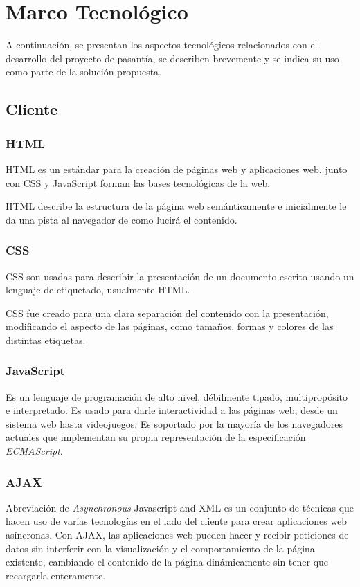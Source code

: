 \chapter{Marco Tecnológico}
\thispagestyle{empty} %

A continuación, se presentan los aspectos tecnológicos relacionados con el desarrollo del proyecto de pasantía, se describen brevemente y se indica su uso como parte de la solución propuesta.

\section{Cliente}

\subsection{HTML}

\gls{HTML} es un estándar para la creación de páginas web y aplicaciones web. junto con \gls{CSS} y JavaScript forman las bases tecnológicas de la web. \cite{bib:html}

HTML describe la estructura de la página web semánticamente e inicialmente le da una pista al navegador de como lucirá el contenido.


\subsection{CSS}
\gls{CSS} son usadas para describir la presentación de un documento escrito usando un lenguaje de etiquetado, usualmente \gls{HTML}. 

\gls{CSS} fue creado para una clara separación del contenido con la presentación, modificando el aspecto de las páginas, como tamaños, formas y colores de las distintas etiquetas. \cite{bib:css}

\subsection{JavaScript}
Es un lenguaje de programación de alto nivel, débilmente tipado, multipropósito e interpretado. Es usado para darle interactividad a las páginas web, desde un sistema web hasta videojuegos. Es soportado por la mayoría de los navegadores actuales que implementan su propia representación de la especificación \emph{ECMAScript}. \cite{bib:js}

\subsection{AJAX}
Abreviación de \emph{Asynchronous} Javascript and \gls{XML} es un conjunto de técnicas que hacen uso de varias tecnologías en el lado del cliente para crear aplicaciones web asíncronas. Con \gls{AJAX}, las aplicaciones web pueden hacer y recibir peticiones de datos sin interferir con la visualización y el comportamiento de la página existente, cambiando el contenido de la página dinámicamente sin tener que recargarla enteramente. \cite{bib:ajax}

